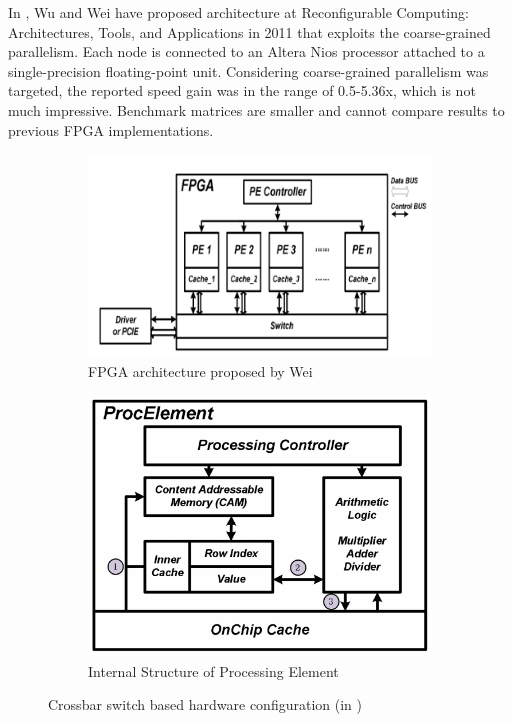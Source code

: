 In \cite{WuWei}, Wu and Wei have proposed architecture at Reconfigurable Computing: Architectures, Tools, and Applications in 2011 that exploits the coarse-grained parallelism. Each node is connected to an Altera Nios processor attached to a single-precision floating-point unit. Considering coarse-grained parallelism was targeted, the reported speed gain was in the range of 0.5-5.36x, which is not much impressive. Benchmark matrices are smaller and cannot compare results to previous FPGA implementations.
\begin{figure}[H]
    \centering
    \begin{subfigure}[b]{0.5\textwidth}
        \centering
        \includegraphics[width = 0.95\linewidth]{./ReviewLit/Wei_FPGA.png}
        \caption{FPGA architecture proposed by Wei}
    \end{subfigure}%
    \begin{subfigure}[b]{0.5\textwidth}
        \centering
        \includegraphics[width = 0.95\linewidth]{./ReviewLit/Wei_PE.png}
        \caption{Internal Structure of Processing Element}
    \end{subfigure}
    \caption{Crossbar switch based hardware configuration (in \cite{WuWei})}
    \label{fig:Into:kapre}
\end{figure}
